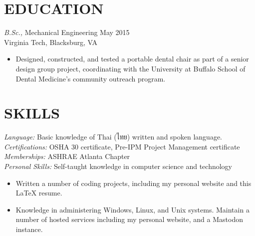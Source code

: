 \documentclass[margin]{res}
\begin{document}
\begin{resume}
\section{EDUCATION} {\sl B.Sc.,} Mechanical Engineering \hfill  May 2015 \\
    Virginia Tech, Blacksburg, VA
    \begin{itemize}  \itemsep -2pt %
        \item Designed, constructed, and tested a portable dental chair as part of a senior design group project, coordinating with the University at Buffalo School of Dental Medicine's community outreach program.
    \end{itemize}

\section{SKILLS}
    {\sl Language:} Basic knowledge of Thai (ไทย) written and spoken language. \\
    {\sl Certifications:} OSHA 30 certificate, Pre-IPM Project Management certificate \\
    {\sl Memberships:} ASHRAE Atlanta Chapter \\
    {\sl Personal Skills:} Self-taught knowledge in computer science and technology
    \begin{itemize} \itemsep -2pt
    \item Written a number of coding projects, including my personal website and this \LaTeX{} resume. 
    \item Knowledge in administering Windows, Linux, and Unix systems. Maintain a number of hosted services including my personal website, and a Mastodon instance.
    \end{itemize}

\end{resume}
\end{document}
